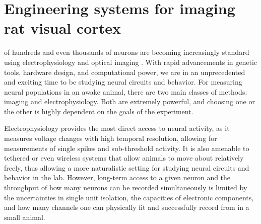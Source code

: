 


\chapter{Engineering systems for imaging rat visual cortex}
 of hundreds and even thousands of neurons are becoming increasingly standard using electrophysiology \cite{Stringer2019b, Steinmetz2019, Siegle2021} and optical imaging \cite{Stringer2019a, Weisenburger2019, Sofroniew2016}. With rapid advancements in genetic tools, hardware design, and computational power, we are in an unprecedented and exciting time to be studying neural circuits and behavior. For measuring neural populations in an awake animal, there are two main classes of methods: imaging and electrophysiology. Both are extremely powerful, and choosing one or the other is highly dependent on the goals of the experiment. 

Electrophysiology provides the most direct access to neural activity, as it measures voltage changes with high temporal resolution, allowing for measurements of single spikes and sub-threshold activity. It is also amenable to tethered or even wireless systems that allow animals to move about relatively freely, thus allowing a more naturalistic setting for studying neural circuits and behavior in the lab. However, long-term access to a given neuron and the throughput of how many neurons can be recorded simultaneously is limited by the uncertainties in single unit isolation, the capacities of electronic components, and how many channels one can physically fit and successfully record from in a small animal. 

